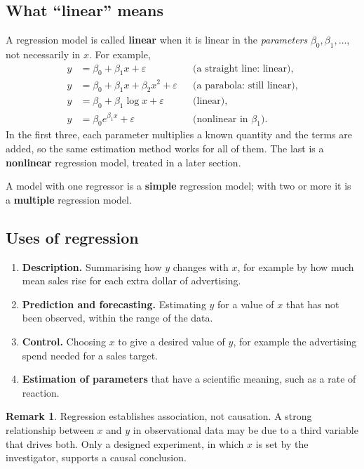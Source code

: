 \documentclass[11pt,a4paper]{article}
\numberwithin{equation}{section}
\theoremstyle{definition}
\newtheorem*{remark}{Remark}
\begin{document}
\subsection{What ``linear'' means}
A regression model is called \textbf{linear} when it is linear in the \emph{parameters}
$\beta_0, \beta_1, \dots$, not necessarily in $x$. For example,
\begin{align*}
y &= \beta_0 + \beta_1 x + \varepsilon && \text{(a straight line: linear)}, \\
y &= \beta_0 + \beta_1 x + \beta_2 x^2 + \varepsilon && \text{(a parabola: still linear)}, \\
y &= \beta_0 + \beta_1 \log x + \varepsilon && \text{(linear)}, \\
y &= \beta_0 e^{\beta_1 x} + \varepsilon && \text{(nonlinear in $\beta_1$)} .
\end{align*}
In the first three, each parameter multiplies a known quantity and the terms are added, so
the same estimation method works for all of them. The last is a \textbf{nonlinear}
regression model, treated in a later section.

A model with one regressor is a \textbf{simple} regression model; with two or more it is a
\textbf{multiple} regression model.

\subsection{Uses of regression}
\begin{enumerate}
\item \textbf{Description.} Summarising how $y$ changes with $x$, for example by how much mean
sales rise for each extra dollar of advertising.
\item \textbf{Prediction and forecasting.} Estimating $y$ for a value of $x$ that has not been
observed, within the range of the data.
\item \textbf{Control.} Choosing $x$ to give a desired value of $y$, for example the
advertising spend needed for a sales target.
\item \textbf{Estimation of parameters} that have a scientific meaning, such as a rate of
reaction.
\end{enumerate}

\begin{remark}
Regression establishes association, not causation. A strong relationship between $x$ and $y$
in observational data may be due to a third variable that drives both. Only a designed
experiment, in which $x$ is set by the investigator, supports a causal conclusion.
\end{remark}
\end{document}
